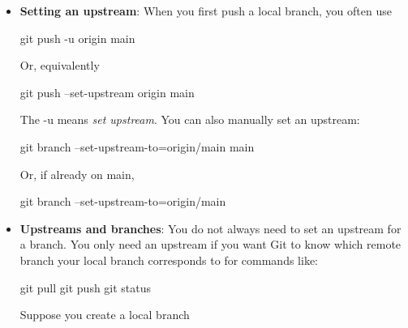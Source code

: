 \documentclass{report}
\begin{document}
\begin{itemize}
\begin{bashcode}
            \end{bashcode}
            \bigbreak \noindent 
            Also,
            \bigbreak \noindent 
            \begin{bashcode}
                git pull
            \end{bashcode}
            \bigbreak \noindent 
            usually means
            \bigbreak \noindent 
            \begin{bashcode}
                git fetch origin
                git merge origin/main
            \end{bashcode}
        \item \textbf{Setting an upstream}: When you first push a local branch, you often use
            \bigbreak \noindent 
            \begin{bashcode}
                git push -u origin main
            \end{bashcode}
            \bigbreak \noindent 
            Or, equivalently
            \bigbreak \noindent 
            \begin{bashcode}
                git push --set-upstream origin main
            \end{bashcode}
            \bigbreak \noindent 
            The -u means \textit{set upstream}.
            \bigbreak \noindent 
            You can also manually set an upstream:
            \bigbreak \noindent 
            \begin{bashcode}
                git branch --set-upstream-to=origin/main main
            \end{bashcode}
            \bigbreak \noindent 
            Or, if already on main,
            \bigbreak \noindent 
            \begin{bashcode}
                git branch --set-upstream-to=origin/main
            \end{bashcode}
        \item \textbf{Upstreams and branches}: You do not always need to set an upstream for a branch.
            \bigbreak \noindent 
            You only need an upstream if you want Git to know which remote branch your local branch corresponds to for commands like:
            \bigbreak \noindent 
            \begin{bashcode}
                git pull
                git push
                git status
            \end{bashcode}
            \bigbreak \noindent 
            Suppose you create a local branch
            \bigbreak \noindent 
            \begin{bashcode}

\end{bashcode}
\end{itemize}
\end{document}
